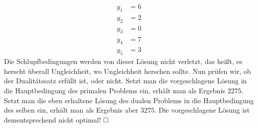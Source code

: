 \documentclass [a4paper,11pt]{article}
\begin{document}
\begin{enumerate}
\begin{enumerate}
                    \begin{align*}
                        y_1 &= 6\\
                        y_2 &= 2\\
                        y_3 &= 0\\
                        y_4 &= 7\\
                        y_5 &= 3
                    \end{align*}
                    Die Schlupfbedingungen werden von dieser Lösung nicht verletzt, das heißt, es herscht überall Ungleichheit, wo Ungleichheit herschen sollte.
                    Nun prüfen wir, ob der Dualitätssatz erfüllt ist, oder nicht. Setzt man die vorgeschlagene Lösung in die Hauptbedingung des primalen Problems
                    ein, erhält man als Ergebnis $2275$. Setzt man die eben erhaltene Lösung des dualen Problems in die Hauptbedingung des selben ein,
                    erhält man als Ergebnis aber $3275$. Die vorgeschlagene Lösung ist dementsprechend nicht optimal! $\qed$
            \end{enumerate}

    \end{enumerate}
\end{document}
